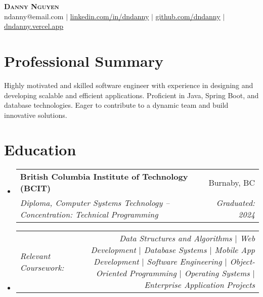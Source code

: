 \documentclass[letterpaper,11pt]{article}
\makeatletter
\newcommand{\resumeSubheading}[4]{
\vspace{-2pt}\item
\begin{tabular*}{0.97\textwidth}[t]{l@{\extracolsep{\fill}}r}
\textbf{#1} & #2 \\
\textit{\small#3} & \textit{\small #4} \\
\end{tabular*}\vspace{-7pt}
}
\newcommand{\resumeSubSubheading}[2]{
\item
\begin{tabular*}{0.97\textwidth}{l@{\extracolsep{\fill}}r}
\textit{\small#1} & \textit{\small #2} \\
\end{tabular*}\vspace{-7pt}
}
\newcommand{\resumeSubHeadingListStart}{\begin{itemize}[leftmargin=0.15in, label={}]}
\newcommand{\resumeSubHeadingListEnd}{\end{itemize}}
\makeatother
\begin{document}
\begin{center}
\textbf{\Huge \scshape Danny Nguyen} \\ \vspace{1pt}
\small ndanny@email.com $|$ \href{https://linkedin.com/in/dndanny}{\underline{linkedin.com/in/dndanny}} $|$
\href{https://github.com/dndanny}{\underline{github.com/dndanny}} $|$
\href{https://dndanny.vercel.app}{\underline{dndanny.vercel.app}}
\end{center}


\section{Professional Summary} %
Highly motivated and skilled software engineer with experience in designing and developing scalable and efficient applications. Proficient in Java, Spring Boot, and database technologies. Eager to contribute to a dynamic team and build innovative solutions.

\section{Education}
\resumeSubHeadingListStart
\resumeSubheading{British Columbia Institute of Technology (BCIT)}{Burnaby, BC}{Diploma, Computer Systems Technology – Concentration: Technical Programming}{Graduated: 2024}
\resumeSubSubheading{Relevant Coursework:}{Data Structures and Algorithms $|$ Web Development $|$ Database Systems $|$ Mobile App Development $|$ Software Engineering $|$ Object-Oriented Programming $|$ Operating Systems $|$ Enterprise Application Projects}
\resumeSubHeadingListEnd
\end{document}
